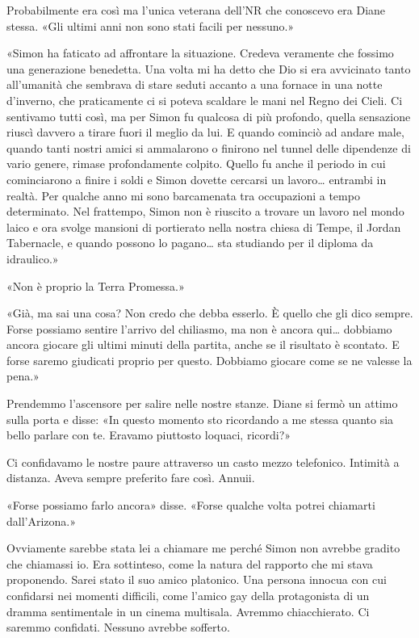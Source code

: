 Probabilmente era così ma l'unica veterana dell'NR che conoscevo era
Diane stessa. «Gli ultimi anni non sono stati facili per nessuno.»

«Simon ha faticato ad affrontare la situazione. Credeva veramente che
fossimo una generazione benedetta. Una volta mi ha detto che Dio si era
avvicinato tanto all'umanità che sembrava di stare seduti accanto a una
fornace in una notte d'inverno, che praticamente ci si poteva scaldare
le mani nel Regno dei Cieli. Ci sentivamo tutti così, ma per Simon fu
qualcosa di più profondo, quella sensazione riuscì davvero a tirare
fuori il meglio da lui. E quando cominciò ad andare male, quando tanti
nostri amici si ammalarono o finirono nel tunnel delle dipendenze di
vario genere, rimase profondamente colpito. Quello fu anche il periodo
in cui cominciarono a finire i soldi e Simon dovette cercarsi un
lavoro\ldots{} entrambi in realtà. Per qualche anno mi sono barcamenata
tra occupazioni a tempo determinato. Nel frattempo, Simon non è riuscito
a trovare un lavoro nel mondo laico e ora svolge mansioni di portierato
nella nostra chiesa di Tempe, il Jordan Tabernacle, e quando possono lo
pagano\ldots{} sta studiando per il diploma da idraulico.»

«Non è proprio la Terra Promessa.»

«Già, ma sai una cosa? Non credo che debba esserlo. È quello che gli
dico sempre. Forse possiamo sentire l'arrivo del chiliasmo, ma non è
ancora qui\ldots{} dobbiamo ancora giocare gli ultimi minuti della
partita, anche se il risultato è scontato. E forse saremo giudicati
proprio per questo. Dobbiamo giocare come se ne valesse la pena.»

Prendemmo l'ascensore per salire nelle nostre stanze. Diane si fermò un
attimo sulla porta e disse: «In questo momento sto ricordando a me
stessa quanto sia bello parlare con te. Eravamo piuttosto loquaci,
ricordi?»

Ci confidavamo le nostre paure attraverso un casto mezzo telefonico.
Intimità a distanza. Aveva sempre preferito fare così. Annuii.

«Forse possiamo farlo ancora» disse. «Forse qualche volta potrei
chiamarti dall'Arizona.»

Ovviamente sarebbe stata lei a chiamare me perché Simon non avrebbe
gradito che chiamassi io. Era sottinteso, come la natura del rapporto
che mi stava proponendo. Sarei stato il suo amico platonico. Una persona
innocua con cui confidarsi nei momenti difficili, come l'amico gay della
protagonista di un dramma sentimentale in un cinema multisala. Avremmo
chiacchierato. Ci saremmo confidati. Nessuno avrebbe sofferto.

